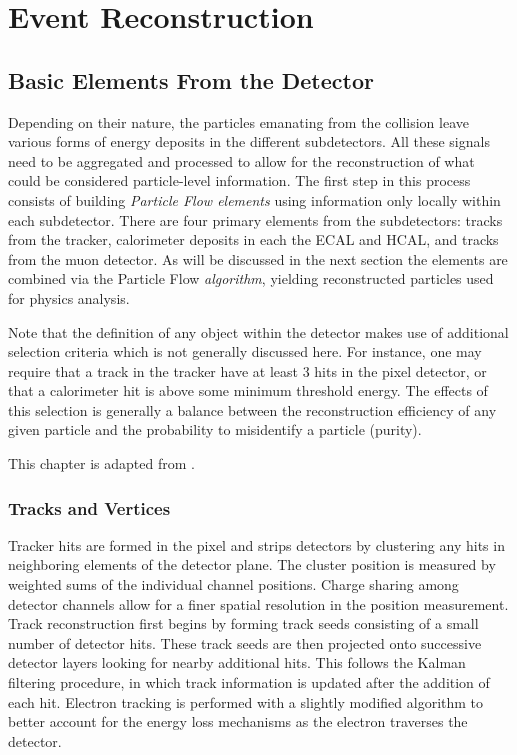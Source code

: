 \chapter{Event Reconstruction}
\label{chap:eventreco}

\section{Basic Elements From the Detector} 

Depending on their nature, the particles emanating from the collision leave various forms of energy deposits in the different subdetectors. All these signals need to be aggregated and processed to allow for the reconstruction of what could be considered particle-level information. The first step in this process consists of building \textit{Particle Flow elements} using information only locally within each subdetector. There are four primary elements from the subdetectors: tracks from the tracker, calorimeter deposits in each the ECAL and HCAL, and tracks from the muon detector. As will be discussed in the next section the elements are combined via the Particle Flow \textit{algorithm}, yielding reconstructed particles used for physics analysis.

Note that the definition of any object within the detector makes use of additional selection criteria which is not generally discussed here. For instance, one may require that a track in the tracker have at least 3 hits in the pixel detector, or that a calorimeter hit is above some minimum threshold energy. The effects of this selection is generally a balance between the reconstruction efficiency of any given particle and the probability to misidentify a particle (purity).

This chapter is adapted from \cite{CMS-PRF-14-001}.

\subsection{Tracks and Vertices}

Tracker hits are formed in the pixel and strips detectors by clustering any hits in neighboring elements of the detector plane. The cluster position is measured by weighted sums of the individual channel positions. Charge sharing among detector channels allow for a finer spatial resolution in the position measurement. Track reconstruction first begins by forming track seeds consisting of a small number of detector hits. These track seeds are then projected onto successive detector layers looking for nearby additional hits. This follows the Kalman filtering procedure, in which track information is updated after the addition of each hit. Electron tracking is performed with a slightly modified algorithm to better account for the energy loss mechanisms as the electron traverses the detector. \cite{trackerreco}

